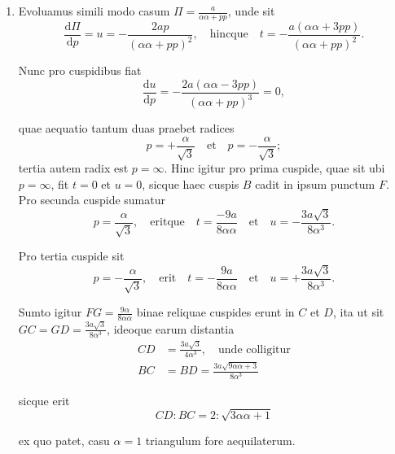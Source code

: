\documentclass[10pt,a4paper]{article}
\def\D{\mathrm{d}}
\begin{document}
\begin{paracol}{2}
\begin{enumerate}[topsep=1px]
		\item Evoluamus simili modo casum $\Pi = \frac{a}{\alpha\alpha + pp}$, unde sit
		\[
			\frac{\D \Pi}{\D p} = u = -\frac{2a p}{(\alpha \alpha + pp)^2}, \quad \text{hincque}\quad t = -\frac{a(\alpha \alpha+ 3pp)}{(\alpha \alpha +pp)^2}.
		\]
		\par Nunc pro cuspidibus fiat
		\[
			\frac{\D u}{ \D p} = -\frac{2a(\alpha\alpha- 3pp)}{(\alpha\alpha+ pp)^3} = 0,
		\]
		\par quae aequatio tantum duas praebet radices
		\[
			p = +\frac{\alpha}{\sqrt{3}} \quad \text{et} \quad p = -\frac{\alpha}{\sqrt{3}};
		\]
		tertia autem radix est $p=\infty$. Hinc igitur pro prima cuspide, quae sit ubi $p=\infty$, fit $t=0$ et $u=0$, sicque haec cuspis $B$ cadit in ipsum punctum $F$. Pro secunda cuspide sumatur
		\[
			p = \frac{\alpha}{\sqrt{3}}, \quad \text{eritque}\quad t = \frac{-9a}{8\alpha \alpha} \quad \text{et} \quad u=-\frac{3a \sqrt{3}}{8\alpha^3}.
		\]
		\par Pro tertia cuspide sit
		\[
			p = -\frac{\alpha}{\sqrt{3}}, \quad \text{erit} \quad t = -\frac{9a}{8\alpha \alpha} \quad \text{et} \quad u=+\frac{3a \sqrt{3}}{8\alpha^3}.
		\]
		\par Sumto igitur $FG = \frac{9\alpha}{8\alpha \alpha}$ binae reliquae cuspides erunt in $C$ et $D$, ita ut sit $GC = GD = \frac{3a \sqrt{3}}{8\alpha^3}$, ideoque earum distantia
		\begin{align*}
			CD& = \frac{3a \sqrt{3}}{4\alpha^3}, \quad \text{unde colligitur}\\
			BC &= BD = \frac{3a \sqrt{9\alpha \alpha+3}}{8\alpha^3}
		\end{align*}
		\par sicque erit
		\[
			CD : BC = 2:\sqrt{3\alpha\alpha + 1}
		\]
		\par ex quo patet, casu $\alpha = 1$ triangulum fore aequilaterum.
		

\end{enumerate}
\end{paracol}
\end{document}
